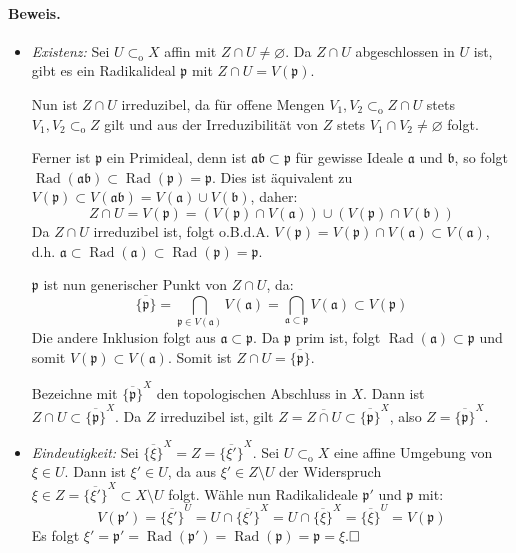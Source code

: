 \documentclass[11pt,b5paper,openany]{memoir}
\def \qed {$\hfill\square$}
\begin{document}
\paragraph{Beweis.}\begin{itemize}
\item \textit{Existenz:} Sei $U\subset_\text{o}X$ affin mit $Z\cap U\neq\varnothing$. Da $Z\cap U$ abgeschlossen in $U$ ist, gibt es ein Radikalideal $\mathfrak{p}$ mit $Z\cap U=V(\mathfrak{p})$. 

Nun ist $Z\cap U$ irreduzibel, da für offene Mengen $V_1,V_2\subset_\text{o} Z\cap U$ stets $V_1,V_2\subset_\text{o}Z$ gilt und aus der Irreduzibilität von $Z$ stets $V_1\cap V_2\neq\varnothing$ folgt. 

Ferner ist $\mathfrak{p}$ ein Primideal, denn ist $\mathfrak{ab}\subset\mathfrak{p}$ für gewisse Ideale $\mathfrak{a}$ und $\mathfrak{b}$, so folgt $\operatorname{Rad}(\mathfrak{ab})\subset\operatorname{Rad}(\mathfrak{p})=\mathfrak{p}$. Dies ist äquivalent zu $V(\mathfrak{p})\subset V(\mathfrak{ab})=V(\mathfrak{a})\cup V(\mathfrak{b})$, daher:
\[Z\cap U =V(\mathfrak{p})=(V(\mathfrak{p})\cap V(\mathfrak{a}))\cup (V(\mathfrak{p})\cap V(\mathfrak{b})) \]
Da $Z\cap U$ irreduzibel ist, folgt o.B.d.A. $V(\mathfrak{p})=V(\mathfrak{p})\cap V(\mathfrak{a})\subset V(\mathfrak{a})$, d.h. $\mathfrak{a}\subset\operatorname{Rad}(\mathfrak{a})\subset\operatorname{Rad}(\mathfrak{p})=\mathfrak{p}$.

$\mathfrak{p}$ ist nun generischer Punkt von $Z\cap U$, da:
\[\overline{\{\mathfrak{p}\}}=\bigcap_{\mathfrak{p}\in V(\mathfrak{a})}V(\mathfrak{a})=\bigcap_{\mathfrak{a}\subset\mathfrak{p}} V(\mathfrak{a})\subset V(\mathfrak{p}) \]
Die andere Inklusion folgt aus $\mathfrak{a}\subset\mathfrak{p}$. Da $\mathfrak{p}$ prim ist, folgt $\operatorname{Rad}(\mathfrak{a})\subset\mathfrak{p}$ und somit $V(\mathfrak{p})\subset V(\mathfrak{a})$. Somit ist $Z\cap U=\overline{\{\mathfrak{p}\}}$.

Bezeichne mit $\overline{\{\mathfrak{p}\}}^X$ den topologischen Abschluss in $X$. Dann ist $Z\cap U\subset\overline{\{\mathfrak{p}\}}^X$. Da $Z$ irreduzibel ist, gilt $Z=\overline{Z\cap U}\subset\overline{\{\mathfrak{p}\}}^X$, also $Z=\overline{\{\mathfrak{p}\}}^X$.
\item \textit{Eindeutigkeit:} Sei $\overline{\{\xi\}}^X=Z=\overline{\{\xi'\}}^X$. Sei $U\subset_\text{o}X$ eine affine Umgebung von $\xi\in U$. Dann ist $\xi'\in U$, da aus $\xi'\in Z\setminus U$ der Widerspruch $\xi\in Z=\overline{\{\xi'\}}^X\subset X\setminus U$ folgt. Wähle nun Radikalideale $\mathfrak{p}'$ und $\mathfrak{p}$ mit:
\[V(\mathfrak{p}')= \overline{\{\xi'\}}^U=U\cap \overline{\{\xi'\}}^X=U\cap\overline{\{\xi\}}^X=\overline{\{\xi\}}^U=V(\mathfrak{p}) \]
Es folgt $\xi'=\mathfrak{p}'=\operatorname{Rad}(\mathfrak{p}')=\operatorname{Rad}(\mathfrak{p})=\mathfrak{p}=\xi$.\qed
\end{itemize}
\end{document}
